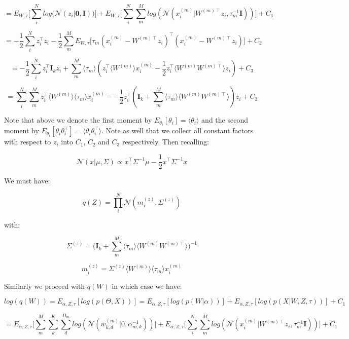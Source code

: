 \documentclass{article}
\begin{document}
$$ = E_{W,\tau}\bigg[\sum_i^N{log(\mathcal{N}(z_i|\textbf{0}, \textbf{I})})\bigg] + E_{W,\tau}\bigg[\sum_i^N{\sum_m^M{log(\mathcal{N}(x_i^{(m)}|W^{(m)\intercal}z_i, \tau_m^{-1}\textbf{I}))}}\bigg] + C_1$$

$$ = -\frac{1}{2}\sum_i^N{z_i^\intercal z_i -\frac{1}{2}\sum_m^M{E_{W,\tau}\bigg[\tau_m(x_i^{(m)} - W^{(m)\intercal}z_i)^\intercal(x_i^{(m)} - W^{(m)\intercal}z_i) \bigg]}} + C_2$$

$$ = -\frac{1}{2}\sum_i^N{z_i^\intercal \textbf{I}_k z_i + \sum_m^M{\langle\tau_m\rangle(z_i^\intercal \langle W^{(m)}\rangle x_i^{(m)} -\frac{1}{2} z_i^\intercal \langle W^{(m)}W^{(m)\intercal}\rangle z_i)}} + C_3$$

$$ = \sum_i^N{\sum_m^M{z_i^\intercal \langle W^{(m)}\rangle \langle\tau_m\rangle x_i^{(m)} - -\frac{1}{2}z_i^\intercal (\textbf{I}_k + \sum_m^M{\langle\tau_m\rangle \langle W^{(m)}W^{(m)\intercal}\rangle} )z_i}} + C_3$$

Note that above we denote the first moment by $E_{\theta_i}[\theta_i] = \langle \theta_i \rangle$ and the second moment by $E_{\theta_i}[\theta_i \theta_i^\intercal] = \langle \theta_i \theta_i^\intercal \rangle$. Note as well that we collect all constant factors with respect to $z_i$ into $C_1$, $C_2$ and $C_3$ respectively. Then recalling:

$$\mathcal{N}(x|\mu,\Sigma) \propto x^\intercal \Sigma^{-1} \mu - \frac{1}{2} x^\intercal \Sigma^{-1} x$$

We must have:

$$q(Z) = \prod_i^N{\mathcal{N}(m_i^{(z)},\Sigma^{(z)})}$$

with:

$$\Sigma^{(z)} = \bigg(\textbf{I}_k + \sum_m^M{\langle\tau_m\rangle \langle W^{(m)}W^{(m)\intercal}\rangle} \bigg)^{-1}$$

$$m_i^{(z)} = \Sigma^{(z)} \langle W^{(m)}\rangle \langle\tau_m\rangle x_i^{(m)}$$

\bigskip

Similarly we proceed with $q(W)$ in which case we have:

$$log(q(W)) = E_{\alpha,Z,\tau}[log(p(\Theta,X))] = E_{\alpha,Z,\tau}[log(p(W|\alpha))] + E_{\alpha,Z,\tau}[log(p(X|W,Z,\tau))] + C_1$$

$$=E_{\alpha,Z,\tau}\bigg[\sum_{m}^M{\sum_{k}^K{\sum_{d}^{D_m}{log(\mathcal{N}(w_{k,d}^{(m)}|0, \alpha_{m,k}^{-1}))}}}\bigg] + E_{\alpha,Z,\tau}\bigg[\sum_i^N{\sum_m^M{log(\mathcal{N}(x_i^{(m)}|W^{(m)\intercal}z_i, \tau_m^{-1}\textbf{I}))}}\bigg] + C_1$$
\end{document}
